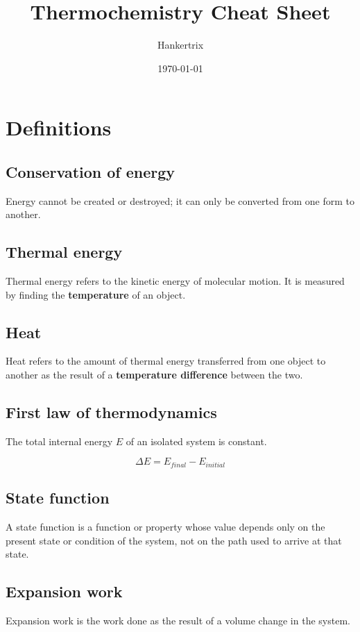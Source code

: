 \documentclass[11pt]{article}
\author{Hankertrix}
\date{\today}
\title{Thermochemistry Cheat Sheet}
\begin{document}
\maketitle
\setcounter{tocdepth}{2}
\tableofcontents

\newpage

\section{Definitions}
\label{sec:orgde4c3fd}

\subsection{Conservation of energy}
\label{sec:org398447e}
Energy cannot be created or destroyed; it can only be converted from one form to another.

\subsection{Thermal energy}
\label{sec:org41a01c8}
Thermal energy refers to the kinetic energy of molecular motion. It is measured by finding the \textbf{temperature} of an object.

\subsection{Heat}
\label{sec:orgb8698d8}
Heat refers to the amount of thermal energy transferred from one object to another as the result of a \textbf{temperature difference} between the two.

\subsection{First law of thermodynamics}
\label{sec:org92537c7}
The total internal energy \(E\) of an isolated system is constant.

\[\Delta E  = E_{final} - E_{initial}\]

\subsection{State function}
\label{sec:org9bae28f}
A state function is a function or property whose value depends only on the present state or condition of the system, not on the path used to arrive at that state.

\subsection{Expansion work}
\label{sec:org830884f}
Expansion work is the work done as the result of a volume change in the system.
\end{document}
